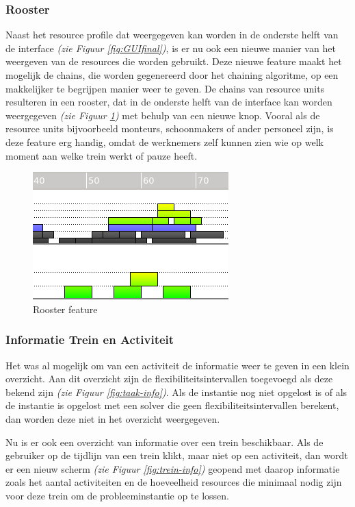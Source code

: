 \subsubsection*{Rooster}
Naast het resource profile dat weergegeven kan worden in de onderste helft van de interface \emph{(zie Figuur \ref{fig:GUIfinal})}, is er nu ook een nieuwe manier van het weergeven van de resources die worden gebruikt. Deze nieuwe feature maakt het mogelijk de chains, die worden gegenereerd door het chaining algoritme, op een makkelijker te begrijpen manier weer te geven. De chains van resource units resulteren in een rooster, dat in de onderste helft van de interface kan worden weergegeven \emph{(zie Figuur \ref{fig:rooster})} met behulp van een nieuwe knop. Vooral als de resource units bijvoorbeeld monteurs, schoonmakers of ander personeel zijn, is deze feature erg handig, omdat de werknemers zelf kunnen zien wie op welk moment aan welke trein werkt of pauze heeft. 

\begin{figure}[H]
\center
\includegraphics[width=.5\textwidth]{../images/rooster.png}
\caption{Rooster feature}
\label{fig:rooster}
\end{figure}

\subsubsection*{Informatie Trein en Activiteit}
Het was al mogelijk om van een activiteit de informatie weer te geven in een klein overzicht. Aan dit overzicht zijn de flexibiliteitsintervallen toegevoegd als deze bekend zijn \emph{(zie Figuur \ref{fig:taak-info})}. Als de instantie nog niet opgelost is of als de instantie is opgelost met een solver die geen flexibiliteitsintervallen berekent, dan worden deze niet in het overzicht weergegeven.  

Nu is er ook een overzicht van informatie over een trein beschikbaar. Als de gebruiker op de tijdlijn van een trein klikt, maar niet op een activiteit, dan wordt er een nieuw scherm \emph{(zie Figuur \ref{fig:trein-info})} geopend met daarop informatie zoals het aantal activiteiten en de hoeveelheid resources die minimaal nodig zijn voor deze trein om de probleeminstantie op te lossen. 

